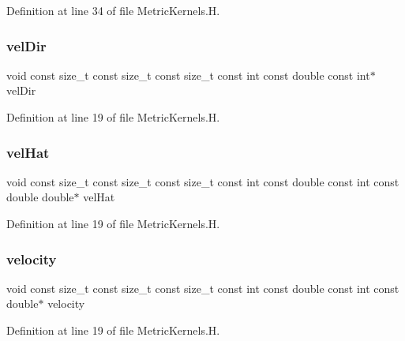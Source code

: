 Definition at line 34 of file Metric\+Kernels.\+H.

\hypertarget{MetricKernels_8H_a25df08ad943d494c17a8ce1d64a0da8f}{}\label{MetricKernels_8H_a25df08ad943d494c17a8ce1d64a0da8f} 
\subsubsection{\texorpdfstring{vel\+Dir}{velDir}}
{\footnotesize\ttfamily void const size\+\_\+t const size\+\_\+t const size\+\_\+t const int const double const int$\ast$ vel\+Dir}



Definition at line 19 of file Metric\+Kernels.\+H.

\hypertarget{MetricKernels_8H_a05a5c93e8f43d622b504e02893ae3d66}{}\label{MetricKernels_8H_a05a5c93e8f43d622b504e02893ae3d66} 
\subsubsection{\texorpdfstring{vel\+Hat}{velHat}}
{\footnotesize\ttfamily void const size\+\_\+t const size\+\_\+t const size\+\_\+t const int const double const int const double double$\ast$ vel\+Hat}



Definition at line 19 of file Metric\+Kernels.\+H.

\hypertarget{MetricKernels_8H_ac09ce3f593a19c2dae1fe2c3ac95a673}{}\label{MetricKernels_8H_ac09ce3f593a19c2dae1fe2c3ac95a673} 
\subsubsection{\texorpdfstring{velocity}{velocity}}
{\footnotesize\ttfamily void const size\+\_\+t const size\+\_\+t const size\+\_\+t const int const double const int const double$\ast$ velocity}



Definition at line 19 of file Metric\+Kernels.\+H.

